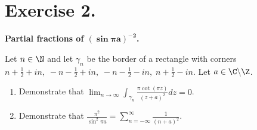 \section*{Exercise 2.}

\textbf{Partial fractions of $\boldsymbol{(\sin \pi a)^{-2}}$.}

Let $n\in \N$ and let $\gamma_n$ be the border of a rectangle with corners $n+\frac{1}{2}+in,\; -n-\frac{1}{2}+in,\; -n-\frac{1}{2}-in,\; n + \frac{1}{2}-in$. Let $a \in \C \backslash \Z$.
\begin{enumerate}[label=(\alph*)]
    \item Demonstrate that $\displaystyle \lim_{n\to \infty} \int_{\gamma_n} \frac{\pi \cot(\pi z)}{(z+a)^2} dz = 0$.
    \item Demonstrate that $\displaystyle \frac{\pi^2}{\sin^2 \pi a} = \sum_{n = -\infty}^{\infty}\frac{1}{(n+a)^2}$.
\end{enumerate}
